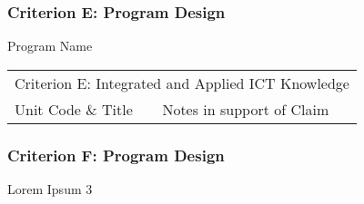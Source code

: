 \documentclass{article}%
\begin{document}
%
\subsubsection{Criterion E: Program Design}%
\label{ssubsec:CriterionEProgramDesign}%
Program Name\newline%
%
\begin{adjustbox}{max width=\textwidth}%
\begin{tabular}{|c|c|c|c|c|c|c|c|c|c|c|c|c|c|c|c|c|c|c|c|}%
\hline%
\multicolumn{20}{|l|}{\multirow{2}{*}{Criterion E: Integrated and Applied ICT Knowledge}}\\%
\multicolumn{20}{|l|}{}\\%
\hline%
\multicolumn{9}{|l|}{Unit Code \& Title}&\multicolumn{11}{|l|}{Notes in support of Claim}\\%
\hline%
\end{tabular}%
\end{adjustbox}

%
\subsubsection{Criterion F: Program Design}%
\label{ssubsec:CriterionFProgramDesign}%
Lorem Ipsum 3

%
\end{document}
